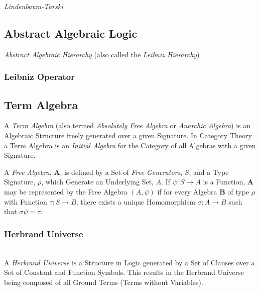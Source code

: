 \emph{Lindenbaum-Tarski}


\subsection{Abstract Algebraic Logic}

\emph{Abstract Algebraic Hierarchy} (also called the \emph{Leibniz
  Hierarchy})



\subsubsection{Leibniz Operator}\label{sec:leibniz_operator}



\subsection{Term Algebra}\label{sec:term_algebra}

A \emph{Term Algebra} (also termed \emph{Absolutely Free Algebra} or
\emph{Anarchic Algebra}) is an Algebraic Structure freely generated
over a given Signature. In Category Theory a Term Algebra is an
\emph{Initial Algebra} for the Category of all Algebras with a given
Signature.

A \emph{Free Algebra}, $\mathbf{A}$, is defined by a Set of \emph{Free
  Generators}, $S$, and a Type Signature, $\rho$, which Generate an
Underlying Set, $A$. If $\psi : S \rightarrow A$ is a Function,
$\mathbf{A}$ may be represented by the Free Algebra $(A,\psi)$ if for
every Algebra $\mathbf{B}$ of type $\rho$ with Function $\tau : S
\rightarrow B$, there exists a unique Homomorphism $\sigma : A
\rightarrow B$ such that $\sigma\psi = \tau$.

\subsubsection{Herbrand Universe}\label{sec:herbrand_universe}
\hfill \\
A \emph{Herbrand Universe} is a Structure in Logic generated by a Set
of Clauses over a Set of Constant and Function Symbols. This results
in the Herbrand Universe being composed of all Ground Terms (Terms
without Variables).

